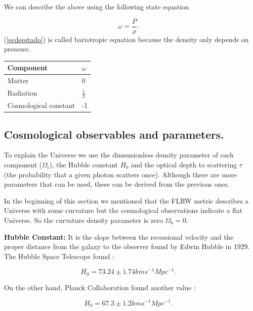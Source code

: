 \documentclass[onecolumn,           %
               showpacs,            %
               preprintnumbers,     %
               aps,                 %
               prl,          	    %
               letterpaper,             %
               superscriptaddress,      %
               nofootinbib,         %
               tightenlines,        %
               floats,floatfix      %
               ,usenatbib,
               ]{revtex4-1}
\begin{document}
We can describe the above using the following state equation

\begin{equation}
\label{ecdeestado}
\omega = \frac{P}{\rho}.
\end{equation}
(\ref{ecdeestado}) is called bariotropic equation because the density only depends on pressure.

\begin{table} [htbp]
	\begin{center}
		\begin{tabular}{|l|l|}
			\hline
			Component & $\omega$\\
			\hline
			Matter & 0 \\
			\hline
			Radiation & $\frac{1}{3}$\\
			\hline
			Cosmological constant & -1 \\
			\hline
		\end{tabular}
	\end{center}
\end{table} 

\subsection{Cosmological observables and parameters.}
To explain the Universe we use the dimensionless density parameter of each component ($\Omega_i$), the Hubble constant $H_0$ and the optical depth to
scattering $\tau$ (the probability that a given photon scatters once). Although there are more parameters that can be used, these can be derived from the previous ones.

In the beginning of this section we mentioned that the FLRW metric describes a Universe with some curvature but the cosmological observations indicate a flat Universe. So the curvature density parameter is zero $\Omega_k = 0$.

\textbf{Hubble Constant:} It is the slope between the recessional velocity and the proper distance from the galaxy to the observer found by Edwin Hubble in 1929. The Hubble Space Telescope found \cite{hubble2016}:

\begin{equation}
H_0 = 73.24 \pm 1.74 kms^{-1} Mpc^{-1}.
\end{equation}

On the other hand, Planck Collaboration found another value \cite{planck}:
	
\begin{equation}
H_0 = 67.3 \pm 1.2 kms^{-1} Mpc^{-1}.
\end{equation}
	
\end{document}
